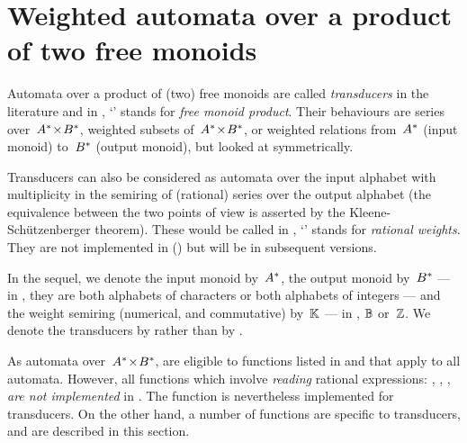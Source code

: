 

\section{Weighted automata over a product of two free monoids}
\label{sec:fmp-fct}

Automata over a product of (two) free monoids are called 
\emph{transducers} in the literature and 
 in \vcsn,  
`' stands for \emph{free monoid product}.
Their behaviours are series over~${{A}^{*}}\! \times \!{{B}^{*}}$, \ie weighted subsets 
of~${{A}^{*}}\! \times \!{{B}^{*}}$, or weighted relations from~${{A}^{*}}$ (input monoid) 
to~${{B}^{*}}$ (output monoid), but looked at symmetrically. 

Transducers can also be considered as automata over the input 
alphabet with multiplicity in the semiring of (rational) series over 
the output alphabet (the equivalence between the two points of view 
is asserted by the Kleene-Sch\"utzenberger theorem).
These would be called  in \vcsn,  
`' stands for \emph{rational weights}. 
They are not 
implemented in \tafkitv (\cf {}) but
will be in subsequent versions.

In the sequel, we denote the input monoid by~${{A}^{*}}$, the output monoid 
by~${{B}^{*}}$ --- in \tafkitv, they are both alphabets of characters or 
both alphabets of integers --- 
and the weight semiring (numerical, and commutative) by~$\mathbb{K}$ --- in 
\tafkitv, $\mathbb{B}$ or~$\mathbb{Z}$.
We denote the transducers by  rather than by .

As automata over~${{A}^{*}}\! \times \!{{B}^{*}}$,  are \apriori
eligible to functions listed in  and that apply to 
all automata.
However,
all functions which involve \emph{reading} rational 
expressions: ,  
, ,
\emph{are not implemented} in \tafkitv.
The function  is nevertheless implemented for 
transducers.
On the other hand, a number of functions are specific to transducers, 
and are described in this section.

